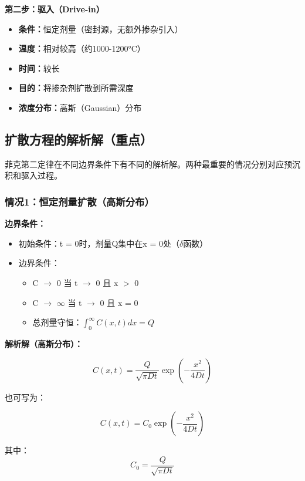 \documentclass[UTF8,12pt,a4paper]{ctexart}
\begin{document}
\textbf{第二步：驱入（Drive-in）}
\begin{itemize}
    \item \textbf{条件：}恒定剂量（密封源，无额外掺杂引入）
    \item \textbf{温度：}相对较高（约1000-1200°C）
    \item \textbf{时间：}较长
    \item \textbf{目的：}将掺杂剂扩散到所需深度
    \item \textbf{浓度分布：}高斯（Gaussian）分布
\end{itemize}

\subsection{扩散方程的解析解（重点）}

菲克第二定律在不同边界条件下有不同的解析解。两种最重要的情况分别对应预沉积和驱入过程。

\subsubsection{情况1：恒定剂量扩散（高斯分布）}

\textbf{边界条件：}
\begin{itemize}
    \item 初始条件：t = 0时，剂量Q集中在x = 0处（$\delta$函数）
    \item 边界条件：
    \begin{itemize}
        \item C $\rightarrow$ 0 当 t $\rightarrow$ 0 且 x $>$ 0
        \item C $\rightarrow$ $\infty$ 当 t $\rightarrow$ 0 且 x = 0
        \item 总剂量守恒：$\int_0^\infty C(x,t) dx = Q$
    \end{itemize}
\end{itemize}

\textbf{解析解（高斯分布）：}

\begin{equation}
C(x,t) = \frac{Q}{\sqrt{\pi D t}} \exp\left(-\frac{x^2}{4Dt}\right)
\end{equation}

也可写为：

\begin{equation}
C(x,t) = C_0 \exp\left(-\frac{x^2}{4Dt}\right)
\end{equation}

其中：
\begin{equation}
C_0 = \frac{Q}{\sqrt{\pi D t}}
\end{equation}
\end{document}
